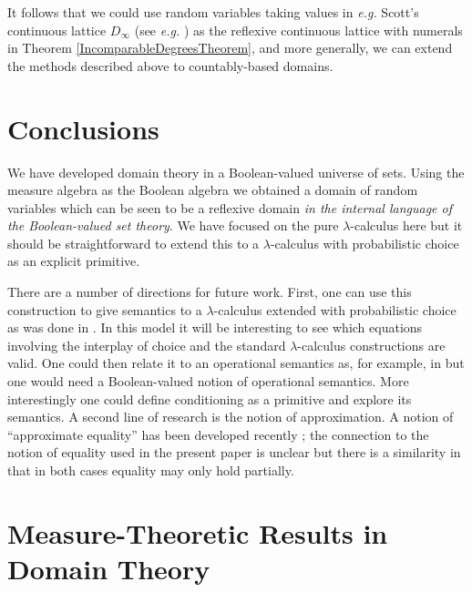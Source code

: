 \documentclass{lmcs}
\begin{document}
It follows that we could use random variables taking values in \emph{e.g.} Scott's continuous lattice $D_\infty$ (see \emph{e.g.} \cite[\S 18.2]{barendregt84}) as the reflexive continuous lattice with numerals in Theorem \ref{IncomparableDegreesTheorem}, and more generally, we can extend the methods described above to countably-based domains. 

\section{Conclusions}
We have developed domain theory in a Boolean-valued universe of sets.  Using the
measure algebra as the Boolean algebra we obtained a domain of random variables
which can be seen to be a reflexive domain \emph{in the internal language of the
	Boolean-valued set theory}.  We have focused on the pure $\lambda$-calculus
here but it should be straightforward to extend this to a $\lambda$-calculus
with probabilistic choice as an explicit primitive.  

There are a number of directions for future work.  First, one can use this construction to give semantics to a $\lambda$-calculus extended with probabilistic choice as was done in \cite{Bacci18b}.  In this model it will be interesting to see which equations involving the interplay of choice and the standard $\lambda$-calculus constructions are valid.  One could then relate it to an operational semantics as, for example, in \cite{Amorim21} but one would need a Boolean-valued notion of operational semantics.  More interestingly one could define conditioning as a primitive and explore its semantics.
%
A second line of research is the notion of approximation.  A notion of ``approximate equality'' has been developed recently \cite{Mardare16}; the connection to the notion of equality used in the present paper is unclear but there is a similarity in that in both cases equality may only hold partially.





\appendix

\section{Measure-Theoretic Results in Domain Theory}
\label{MeasDomainAppendix}
\end{document}
